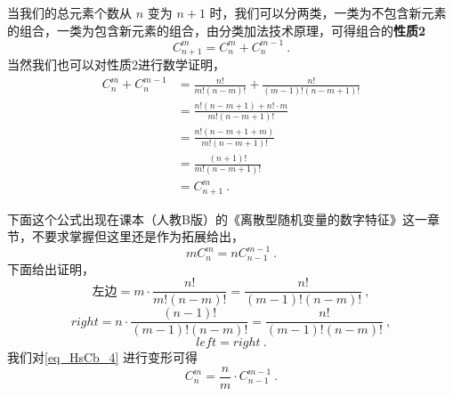 当我们的总元素个数从 $n$ 变为 $n+1$ 时，我们可以分两类，一类为不包含新元素的组合，一类为包含新元素的组合，由分类加法技术原理，可得组合的\textbf{性质2}
\begin{equation}\label{eq_HsCb_5}
C_{n + 1}^m = C_n^m + C_n^{m -1}~.
\end{equation}
当然我们也可以对性质2进行数学证明，
\begin{equation}
\begin{aligned}
C_n^m + C_n^{m - 1} 
&= \frac{n!}{m!(n-m)!} + \frac{n!}{(m - 1)!(n - m + 1)!}\\
&= \frac{n!(n - m + 1) + n!\cdot m}{m!(n - m + 1)!}\\
&= \frac{n!(n - m + 1 + m) }{m!(n - m + 1)!}\\
&= \frac{(n + 1)!}{m!(n - m + 1)!}\\
&= C_{n + 1}^m~.
\end{aligned}
\end{equation}

下面这个公式出现在课本（人教B版）的《离散型随机变量的数字特征》这一章节，不要求掌握但这里还是作为拓展给出，
\begin{equation}\label{eq_HsCb_4}
mC_n^m = nC_{n-1}^{m-1}~.
\end{equation}
下面给出证明，
\begin{equation}
\text{左边} = m\cdot \frac{n!}{m!(n-m)!} = \frac{n!}{(m-1)!(n-m)!}~,
\end{equation}
\begin{equation}
right = n\cdot \frac{(n-1)!}{(m-1)!(n-m)!} = \frac{n!}{(m-1)!(n-m)!}~,
\end{equation}
\begin{equation}
left = right~.
\end{equation}
我们对\autoref{eq_HsCb_4} 进行变形可得
\begin{equation}
C_n^m = \frac{n}{m} \cdot C_{n-1}^{m-1}~.
\end{equation}
